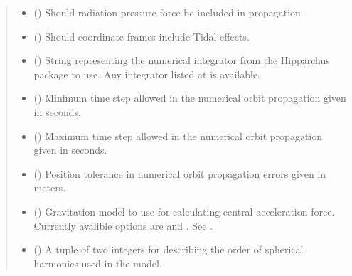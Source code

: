 \documentclass[letterpaper,10pt,english]{sphinxmanual}
\begin{document}
\begin{fulllineitems}
\begin{quote}
\begin{description}
\begin{itemize}
\item {} 
 () \textendash{} Should radiation pressure force be included in propagation.

\item {} 
 () \textendash{} Should coordinate frames include Tidal effects.

\item {} 
 () \textendash{} String representing the numerical integrator from the Hipparchus package to use. Any integrator listed at  is available.

\item {} 
 () \textendash{} Minimum time step allowed in the numerical orbit propagation given in seconds.

\item {} 
 () \textendash{} Maximum time step allowed in the numerical orbit propagation given in seconds.

\item {} 
 () \textendash{} Position tolerance in numerical orbit propagation errors given in meters.

\item {} 
 () \textendash{} Gravitation model to use for calculating central acceleration force. Currently avalible options are  and . See .

\item {} 
 () \textendash{} A tuple of two integers for describing the order of spherical harmonics used in the  model.


\end{itemize}
\end{description}
\end{quote}
\end{fulllineitems}
\end{document}
